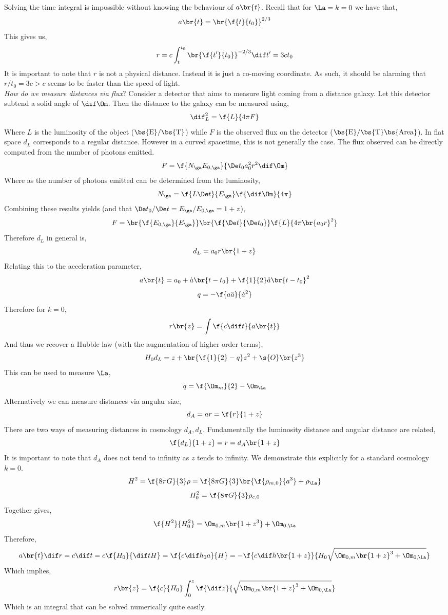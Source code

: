 \documentclass{article}
\begin{document}
Solving the time integral is impossible without knowing the behaviour of $a\br{t}$. Recall that for $\La = k = 0$ we have that,
\[ a\br{t} = \br{\f{t}{t_0}}^{2/3} \]
This gives us,
\[ r = c \int_{t}^{t_0} \br{\f{t'}{t_0}}^{-2/3} \dif t' = 3 c t_0 \]
It is important to note that $r$ is not a physical distance. Instead it is just a co-moving coordinate. As such, it should be alarming that $ r / t_0 = 3 c > c $ seems to be faster than the speed of light. \\

\textit{How do we measure distances via flux}?
Consider a detector that aims to measure light coming from a distance galaxy. Let this detector subtend a solid angle of $\dif \Om$. Then the distance to the galaxy can be measured using,
\[ \dif_L^2 = \f{L}{4\pi F} \]
Where $L$ is the luminosity of the object ($\bs{\text{E}}/\bs{\text{T}}$) while $F$ is the observed flux on the detector ($\bs{\text{E}}/\bs{\text{T}}\bs{\text{Area}}$). In flat space $d_L$ corresponds to a regular distance. However in a curved spacetime, this is not generally the case. The flux observed can be directly computed from the number of photons emitted.
\[  F = \f{N_{\ga} E_{0,\ga}}{\De t_0 a_0^2 r^2 \dif \Om} \]
Where as the number of photons emitted can be determined from the luminosity,
\[ N_{\ga} = \f{L \De t}{E_\ga} \f{\dif \Om}{4 \pi} \]
Combining these results yields (and that $\De t_0 / \De t = E_\ga / E_{0, \ga} = 1 + z$),
\[ F = \br{\f{E_{0,\ga}}{E_{\ga}}} \br{\f{\De t}{\De t_0}} \f{L}{4 \pi \br{a_0 r}^2} \]
Therefore $d_L$ in general is,
\[ d_L = a_0 r\br{1 + z} \]
Relating this to the acceleration parameter,
\[ a\br{t} = a_0 + \dot a \br{t-t_0} + \f{1}{2} \ddot a \br{t- t_0}^2\]
\[ q = -\f{a \ddot a}{\dot a^2} \]
Therefore for $k=0$,
\[ r\br{z} = \int\f{c \dif t}{a\br{t}} \]
And thus we recover a Hubble law (with the augmentation of higher order terms),
\[ H_0 d_L = z + \br{\f{1}{2} - q} z^2 + \s{O}\br{z^3} \]
This can be used to measure $\La$,
\[ q = \f{\Om_m}{2} - \Om_\La \]
Alternatively we can measure distances via angular size,
\[ d_A = ar = \f{r}{1+z} \]
There are two ways of measuring distances in cosmology $d_A, d_L$. Fundamentally the luminosity distance and angular distance are related,
\[ \f{d_L}{1 + z} = r = d_{A} \br{1 + z} \]
It is important to note that $d_A$ does not tend to infinity as $z$ tends to infinity. We demonstrate this explicitly for a standard cosmology $k=0$.
\[ H^2 = \f{8 \pi G}{3} \rho =\f{8 \pi G}{3} \br{\f{\rho_{m, 0}}{a^3} + \rho_\La}\]
\[ H_0^2 = \f{8 \pi G}{3} \rho_{c, 0} \]
Together gives,
\[ \f{H^2}{H_0^2} = \Om_{0, m} \br{1+z^3} + \Om_{0, \La} \]
Therefore,
\[  a\br{t}\dif r = c\dif t = c \f{H_0}{\dif t H} = \f{c \dif h_0 a}{H} =- \f{c \dif h \br{1+z}}{H_0 \sqrt{\Om_{0,m} \br{1 + z}^3 + \Om_{0,\La}}} \]
Which implies,
\[ r\br{z} = \f{c}{H_0} \int_{0}^{z} \f{\dif z}{\sqrt{\Om_{0,m} \br{1 + z}^3 + \Om_{0,\La}}} \]
Which is an integral that can be solved numerically quite easily.
\end{document}
